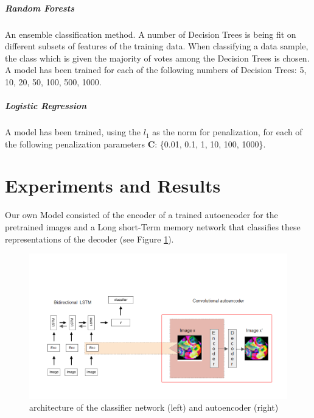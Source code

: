 \documentclass{article}
\begin{document}
\subparagraph{Random Forests}
An ensemble classification method. A number of Decision Trees is being fit on different subsets of features of the training data. When classifying a data sample, the class which is given the majority of votes among the Decision Trees is chosen. A model has been trained for each of the following numbers of Decision Trees: 5, 10, 20, 50, 100, 500, 1000.

\subparagraph{Logistic Regression}
A model has been trained, using the $l_1$ as the norm for penalization, for each of the following penalization parameters \textbf{C}: \{0.01, 0.1, 1, 10, 100, 1000\}.

\section{Experiments and Results}
Our own Model consisted of the encoder of a trained autoencoder for the pretrained images and a Long short-Term memory\cite{LSTM} network that classifies these representations of the decoder (see Figure \ref{fig:net_arch}).
\begin{figure}[!ht]
    \centering
    \includegraphics{network}
    \caption{architecture of the classifier network (left) and autoencoder (right)}\label{fig:net_arch}
\end{figure}
\end{document}
